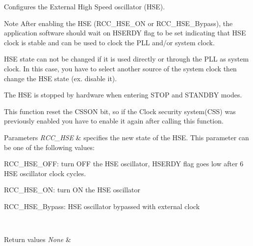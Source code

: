 Configures the External High Speed oscillator (H\+SE). 

\begin{DoxyNote}{Note}
After enabling the H\+SE (R\+C\+C\+\_\+\+H\+S\+E\+\_\+\+ON or R\+C\+C\+\_\+\+H\+S\+E\+\_\+\+Bypass), the application software should wait on H\+S\+E\+R\+DY flag to be set indicating that H\+SE clock is stable and can be used to clock the P\+LL and/or system clock. 

H\+SE state can not be changed if it is used directly or through the P\+LL as system clock. In this case, you have to select another source of the system clock then change the H\+SE state (ex. disable it). 

The H\+SE is stopped by hardware when entering S\+T\+OP and S\+T\+A\+N\+D\+BY modes. ~\newline


This function reset the C\+S\+S\+ON bit, so if the Clock security system(\+C\+S\+S) was previously enabled you have to enable it again after calling this function. ~\newline

\end{DoxyNote}

\begin{DoxyParams}{Parameters}
{\em R\+C\+C\+\_\+\+H\+SE} & specifies the new state of the H\+SE. This parameter can be one of the following values\+: \begin{DoxyItemize}
\item R\+C\+C\+\_\+\+H\+S\+E\+\_\+\+O\+FF\+: turn O\+FF the H\+SE oscillator, H\+S\+E\+R\+DY flag goes low after 6 H\+SE oscillator clock cycles. \item R\+C\+C\+\_\+\+H\+S\+E\+\_\+\+ON\+: turn ON the H\+SE oscillator \item R\+C\+C\+\_\+\+H\+S\+E\+\_\+\+Bypass\+: H\+SE oscillator bypassed with external clock \end{DoxyItemize}
\\
\hline
\end{DoxyParams}

\begin{DoxyRetVals}{Return values}
{\em None} & \\
\hline
\end{DoxyRetVals}
\mbox{\label{group___r_c_c___group1_ga0c6772a1e43765909495f57815ef69e2}} 
